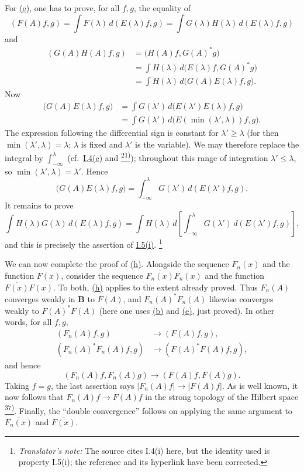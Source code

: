 \documentclass[12pt,b5paper,twoside]{article}
\newcommand{\noteref}[1]{%
  \hyperlink{note:#1}{\textsuperscript{#1)}}}
\newcommand{\translatorfootnote}[2]{%
  \begingroup
  \renewcommand{\thefootnote}{#1}%
  \footnote{\hspace{0.8em}\textit{Translator's note:} #2}%
  \endgroup}
\begin{document}
For \hyperref[prop:II.2.e]{(e)}, one has to prove, for all \(f,g\), the
equality of
\[
 (F(A)f,g)
 =\int F(\lambda)\,d(E(\lambda)f,g)
 =\int G(\lambda)H(\lambda)\,d(E(\lambda)f,g)
\]
and
\begin{align*}
 (G(A)H(A)f,g)
 &=\bigl(H(A)f,G(A)^*g\bigr)\\
 &=\int H(\lambda)\,d\bigl(E(\lambda)f,G(A)^*g\bigr)\\
 &=\int H(\lambda)\,d\bigl(G(A)E(\lambda)f,g\bigr).
\end{align*}
Now
\begin{align*}
 \bigl(G(A)E(\lambda)f,g\bigr)
 &=\int G(\lambda')\,d\bigl(E(\lambda')E(\lambda)f,g\bigr)\\
 &=\int G(\lambda')\,d\bigl(E(\min(\lambda',\lambda))f,g\bigr).
\end{align*}
The expression following the differential sign is constant for
\(\lambda'\geq\lambda\) (for then
\(\min(\lambda',\lambda)=\lambda\); \(\lambda\) is fixed and
\(\lambda'\) is the variable).  We may therefore replace the integral by
\(\int_{-\infty}^{\lambda}\) (cf.\
\hyperref[prop:I.4.e]{I.4(e)} and \noteref{21}); throughout this range of
integration \(\lambda'\leq\lambda\), so
\(\min(\lambda',\lambda)=\lambda'\).  Hence
\[
 \bigl(G(A)E(\lambda)f,g\bigr)
 =\int_{-\infty}^{\lambda}G(\lambda')\,
   d(E(\lambda')f,g).
\]
It remains to prove
\[
 \int H(\lambda)G(\lambda)\,d(E(\lambda)f,g)
 =\int H(\lambda)\,d\left[
    \int_{-\infty}^{\lambda}G(\lambda')\,d(E(\lambda')f,g)
  \right],
\]
and this is precisely the assertion of
\hyperref[prop:I.5.i]{I.5(i)}.\translatorfootnote{T5}{The source cites I.4(i) here,
but the identity used is property I.5(i); the reference and its hyperlink have been
corrected.}

We can now complete the proof of \hyperref[prop:II.2.h]{(h)}.  Alongside
the sequence \(F_n(x)\)
and the function \(F(x)\), consider the sequence
\(\overline{F_n(x)}F_n(x)\) and the function
\(\overline{F(x)}F(x)\).  To both,
\hyperref[prop:II.2.h]{(h)} applies to the extent already
proved.  Thus \(F_n(A)\) converges weakly in \(\mathbf B\) to \(F(A)\),
and \(F_n(A)^*F_n(A)\) likewise converges weakly to \(F(A)^*F(A)\)
(here one uses \hyperref[prop:II.2.b]{(b)} and
\hyperref[prop:II.2.e]{(e)}, just proved).  In other words, for all \(f,g\),
\begin{align*}
 (F_n(A)f,g)&\longrightarrow(F(A)f,g),\\
 (F_n(A)^*F_n(A)f,g)&\longrightarrow(F(A)^*F(A)f,g),
\end{align*}
and hence
\[
 (F_n(A)f,F_n(A)g)\longrightarrow(F(A)f,F(A)g).
\]
Taking \(f=g\), the last assertion says
\(|F_n(A)f|\to|F(A)f|\).  As is well known, it now follows that
\(F_n(A)f\to F(A)f\) in the strong topology of the Hilbert
space\noteref{37}.  Finally, the ``double convergence'' follows on applying
the same argument to \(\overline{F_n(x)}\) and \(\overline{F(x)}\).
\end{document}
